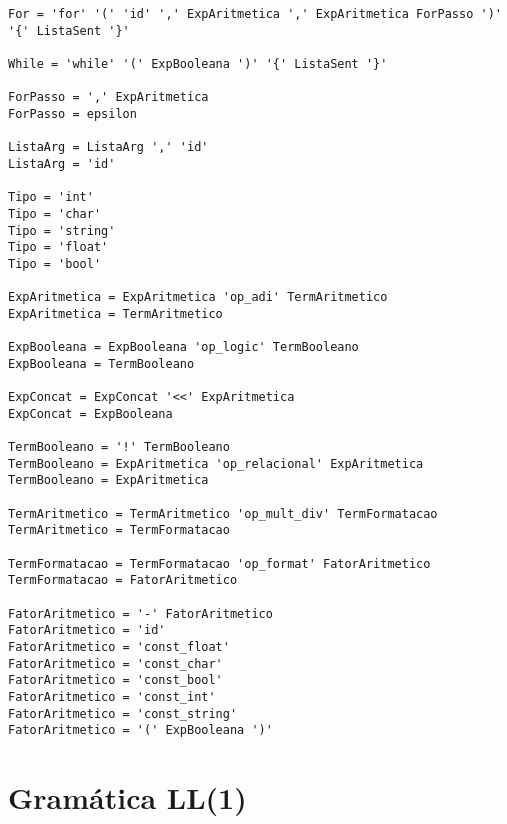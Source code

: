 \documentclass[
  12pt,				%
  oneside,			%
  a4paper,			%
  english,			%
  french,				%
  spanish,			%
  brazil,				%
]{abntex2}
\begin{document}
\begin{lstlisting}[label={code:gramatica-original},caption={Gramática
    original da linguagem de programação LisC.},style={mystyle}]
For = 'for' '(' 'id' ',' ExpAritmetica ',' ExpAritmetica ForPasso ')' '{' ListaSent '}'

While = 'while' '(' ExpBooleana ')' '{' ListaSent '}'

ForPasso = ',' ExpAritmetica
ForPasso = epsilon

ListaArg = ListaArg ',' 'id'
ListaArg = 'id'

Tipo = 'int'
Tipo = 'char'
Tipo = 'string'
Tipo = 'float'
Tipo = 'bool'

ExpAritmetica = ExpAritmetica 'op_adi' TermAritmetico
ExpAritmetica = TermAritmetico

ExpBooleana = ExpBooleana 'op_logic' TermBooleano
ExpBooleana = TermBooleano

ExpConcat = ExpConcat '<<' ExpAritmetica
ExpConcat = ExpBooleana

TermBooleano = '!' TermBooleano
TermBooleano = ExpAritmetica 'op_relacional' ExpAritmetica
TermBooleano = ExpAritmetica

TermAritmetico = TermAritmetico 'op_mult_div' TermFormatacao
TermAritmetico = TermFormatacao

TermFormatacao = TermFormatacao 'op_format' FatorAritmetico
TermFormatacao = FatorAritmetico

FatorAritmetico = '-' FatorAritmetico
FatorAritmetico = 'id'
FatorAritmetico = 'const_float'
FatorAritmetico = 'const_char'
FatorAritmetico = 'const_bool'
FatorAritmetico = 'const_int'
FatorAritmetico = 'const_string'
FatorAritmetico = '(' ExpBooleana ')'

\end{lstlisting}

\chapter{Gramática LL(1)}
\label{cha:gramatica-ll1}
\end{document}
